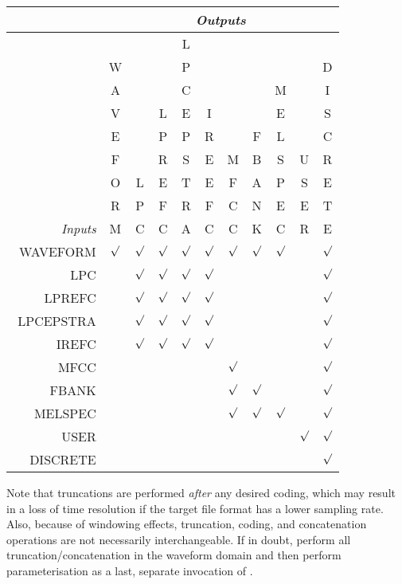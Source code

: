 \begin{center}
\begin{tabular}{|r||cccccccccc|} \cline{2-11}
 \multicolumn{1}{c}{} & \multicolumn{10}{|c|}{\it Outputs } \\
\cline{2-11} \cline{2-11} \hline
          ~ & ~ & ~ & ~ & L  & ~ & ~ & ~ & ~ & ~ & ~  \\ 
          ~ & W & ~ & ~ & P  & ~ & ~ & ~ & ~ & ~ & D  \\ 
          ~ & A & ~ & ~ & C  & ~ & ~ & ~ & M & ~ & I  \\ 
          ~ & V & ~ & L & E  & I & ~ & ~ & E & ~ & S  \\ 
          ~ & E & ~ & P & P  & R & ~ & F & L & ~ & C  \\ 
          ~ & F & ~ & R & S  & E & M & B & S & U & R  \\ 
          ~ & O & L & E & T  & E & F & A & P & S & E  \\ 
          ~ & R & P & F & R  & F & C & N & E & E & T  \\ 
{\it Inputs} & M & C & C & A  & C & C & K & C & R & E  \\ \hline 
~WAVEFORM & $\surd$ & $\surd$ & $\surd$ & $\surd$  &$\surd$& $\surd$ & $\surd$ & $\surd$ & ~ &$\surd$ \\ 
~~~~~~LPC & ~ & $\surd$ & $\surd$ & $\surd$  &$\surd$& ~ & ~ & ~ & ~ &$\surd$ \\ 
~~~LPREFC & ~ & $\surd$ & $\surd$ & $\surd$  &$\surd$& ~ & ~ & ~ & ~ &$\surd$\\
LPCEPSTRA & ~ & $\surd$ & $\surd$ & $\surd$  &$\surd$& ~ & ~ & ~ & ~ &$\surd$\\
~~~~IREFC & ~ & $\surd$ & $\surd$ & $\surd$  &$\surd$& ~ & ~ & ~ & ~ &$\surd$\\
~~~~~MFCC & ~ & ~ & ~ &  ~ & ~ & $\surd$ & ~ & ~ & ~ &$\surd$\\ 
~~~~FBANK & ~ & ~ & ~ &  ~ & ~ & $\surd$ & $\surd$ & ~ & ~ &$\surd$\\
~~MELSPEC & ~ & ~ & ~ &  ~ & ~ & $\surd$ & $\surd$ & $\surd$ & ~ &$\surd$\\
~~~~~USER & ~ & ~ & ~ &  ~ & ~ & ~ & ~ & ~ & $\surd$ &$\surd$ \\
~DISCRETE & ~ & ~ & ~ &  ~ & ~ & ~ & ~ & ~ & ~ & $\surd$  \\ \hline
\end{tabular}
\end{center}

Note that truncations are performed {\em after\/} any desired coding,
which may result in a loss of time resolution if the target file format
has a lower sampling rate. Also, because of windowing effects,
truncation, coding, and concatenation operations are not necessarily
interchangeable.  If in doubt, perform all truncation/concatenation in
the waveform domain and then perform parameterisation as a last, separate
invocation of .

